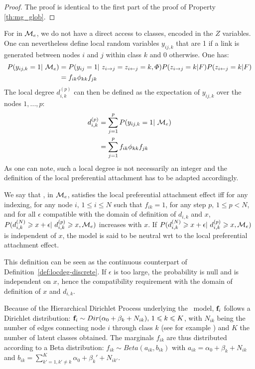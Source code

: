 \begin{proof}
The proof is identical to the first part of the proof of Property \ref{th:mg_glob}.
\end{proof}

\vspace{0.1cm}
For \textbf{\imb} in $\mathcal{M}_e$, we do not have a direct access to classes, encoded in the $Z$ variables. One can nevertheless define  local random variables $y_{ij,k}$ that are 1 if a link is generated between nodes $i$ and $j$ within class $k$ and 0 otherwise. One has:
%
\begin{align*}
P(y_{ij,k}=1 | \M_e) &= P(y_{ij}=1 | z_{i\rightarrow j} = z_{i\leftarrow j}=k, \Phi) P(z_{i\rightarrow j}=k|F)P(z_{i\leftarrow j}=k|F) \\
    &= f_{ik} \phi_{kk} f_{jk}
\end{align*}
%
The local degree $d_{i,k}^{(p)}$ can then be defined as the expectation of $y_{ij,k}$ over the nodes $1,...,p$:
%
\begin{align}\label{def:locdegimb}
d_{i,k}^{(p)} &= \sum_{j=1}^p P(y_{ij,k}=1 | \M_e)  \nonumber \\
    &= \sum_{j=1}^p f_{ik} \phi_{kk} f_{jk}
\end{align}
%
As one can note, such a local degree is not necessarily an integer and the definition of the local preferential attachment has to be adapted accordingly. 
%
\begin{definition}
We say that \imb, in $\mathcal{M}_e$, satisfies the local preferential attachment effect iff for any indexing, for any node $i, \, 1\leq i \leq N$ such that $f_{ik}=1$, for any step $p, \, 1\leq p < N$, and  for all $\epsilon$ compatible with the domain of definition of $d_{i,k}$ and $x$, $P(d_{i,k}^{(N)} \geq x+\epsilon | d_{i,k}^{(p)} \geq x,\M_e)$ increases with $x$. If $P(d_{i,k}^{(N)} \geq x+\epsilon | d_{i,k}^{(p)} \geq x,\M_e)$ is independent of $x$, the model is said to be neutral wrt to the local preferential attachment effect.
\end{definition}

This definition can be seen as the continuous counterpart of Definition~\ref{def:locdeg-discrete}. If $\epsilon$ is too large, the probability is null and is independent on $x$, hence the compatibility requirement with the domain of definition of $x$ and $d_{i,k}$. 

Because of the Hierarchical Dirichlet Process underlying the \imb\ model, $\mathbf{f}_i$ follows a Dirichlet distribution: $\mathbf{f}_i \sim Dir(\alpha_0 + \beta_k + N_{ik}), \, 1 \leqslant k \leqslant K$, with $N_{ik}$ being the number of edges connecting node $i$ through class $k$ (see for example \cite{teh2006hierarchical}) and $K$ the number of latent classes obtained. The marginals $f_{ik}$ are thus distributed according to a Beta distribution: $f_{ik} \sim Beta(a_{ik}, b_{ik})$ with $a_{ik} = \alpha_0 + \beta_k + N_{ik}$ and $b_{ik} = \sum_{k'=1, k' \ne k}^{K} \alpha_0 + \beta_k' + N_{ik'}$.

